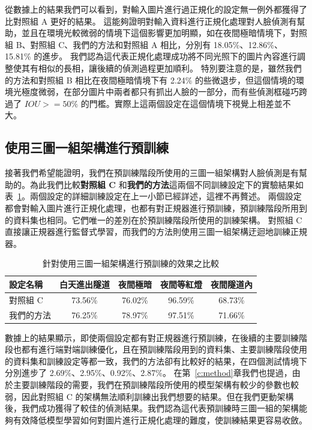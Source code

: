 從數據上的結果我們可以看到，對輸入圖片進行過正規化的設定無一例外都獲得了比對照組 A 更好的結果。
這能夠證明對輸入資料進行正規化處理對人臉偵測有幫助，並且在環境光較微弱的情境下這個影響更加明顯，如在夜間極暗情境下，對照組 B、對照組 C、我們的方法和對照組 A 相比，分別有 18.05\%、12.86\%、15.81\% 的進步。
我們認為這代表正規化處理成功將不同光照下的圖片內容進行調整使其有相似的長相，讓後續的偵測過程更加順利。
特別要注意的是，雖然我們的方法和對照組 B 相比在夜間極暗情境下有 2.24\% 的些微退步，但這個情境的環境光極度微弱，在部分圖片中兩者都只有抓出人臉的一部分，而有些偵測框碰巧跨過了 $IOU >=50\%$ 的門檻。實際上這兩個設定在這個情境下視覺上相差並不大。

\subsection{使用三圖一組架構進行預訓練}

接著我們希望能證明，我們在預訓練階段所使用的三圖一組架構對人臉偵測是有幫助的。為此我們比較\textbf{對照組 C} 和\textbf{我們的方法}這兩個不同訓練設定下的實驗結果如表~\ref{table:triple_compare}。兩個設定的詳細訓練設定在上一小節已經詳述，這裡不再贅述。
兩個設定都會對輸入圖片進行正規化處理，也都有對正規器進行預訓練，預訓練階段所用到的資料集也相同。它們唯一的差別在於預訓練階段所使用的訓練架構。
對照組 C 直接讓正規器進行監督式學習，而我們的方法則使用三圖一組架構迂迴地訓練正規器。

\begin{table}[ht]
    \caption{針對使用三圖一組架構進行預訓練的效果之比較}
    \centering
    \begin{tabular}{l c c c c}
        \hline
        設定名稱 & 白天進出隧道 & 夜間極暗 & 夜間等紅燈 & 夜間隧道內 \\
        \hline
        對照組 C & 73.56\% & 76.02\% & 96.59\% & 68.73\% \\
        我們的方法 & 76.25\% & 78.97\% & 97.51\% & 71.66\% \\
        \hline
    \end{tabular}
    \label{table:triple_compare}
\end{table}

數據上的結果顯示，即使兩個設定都有對正規器進行預訓練，在後續的主要訓練階段也都有進行端對端訓練優化，且在預訓練階段用到的資料集、主要訓練階段使用的資料集和訓練設定等都一致，我們的方法卻有比較好的結果，在四個測試情境下分別進步了 2.69\%、2.95\%、0.92\%、2.87\%。
在第~\ref{c:method}章我們也提過，由於主要訓練階段的需要，我們在預訓練階段所使用的模型架構有較少的參數也較弱，因此對照組 C 的架構無法順利訓練出我們想要的結果。但在我們更動架構後，我們成功獲得了較佳的偵測結果。我們認為這代表預訓練時三圖一組的架構能夠有效降低模型學習如何對圖片進行正規化處理的難度，使訓練結果更容易收斂。

